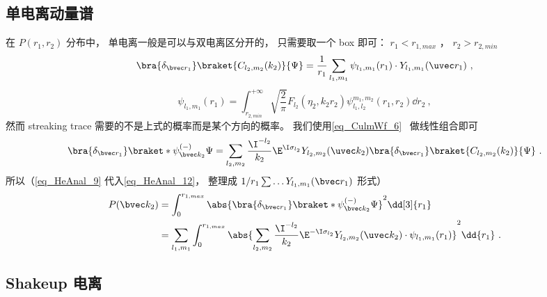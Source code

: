 \subsection{单电离动量谱}
在 $P(r_1, r_2)$ 分布中， 单电离一般是可以与双电离区分开的， 只需要取一个 box 即可： $r_1 < r_{1,max}$ ， $r_2 > r_{2,min}$
\begin{equation}\label{eq_HeAnal_9}
\bra{\delta_{\bvec r_1}}\braket{C_{l_2,m_2}(k_2)}{\Psi} = \frac{1}{r_1} \sum_{l_1, m_1} \psi_{l_1,m_1}(r_1) \cdot Y_{l_1, m_1}(\uvec r_1)~,
\end{equation}
\begin{equation}
\psi_{l_1,m_1}(r_1) = \int_{r_{2,min}}^{+\infty} \sqrt{\frac{2}{\pi}}F_{l_2}(\eta_2, k_2 r_2)\psi_{l_1, l_2}^{m_1, m_2}(r_1, r_2)\dd{r_2}~,
\end{equation}
然而 streaking trace 需要的不是上式的概率而是某个方向的概率。 我们使用\autoref{eq_CulmWf_6}~ 做线性组合即可
\begin{equation}\label{eq_HeAnal_12}
\bra{\delta_{\bvec r_1}}\braket*{\psi_{\bvec k_2}^{(-)}}{\Psi} = \sum_{l_2,m_2} \frac{\I^{-l_2}}{k_2} \E^{\I\sigma_{l_2}}Y_{l_2,m_2}(\uvec k_2) \bra{\delta_{\bvec r_1}}\braket{C_{l_2,m_2}(k_2)}{\Psi}~.
\end{equation}
所以（\autoref{eq_HeAnal_9} 代入\autoref{eq_HeAnal_12}， 整理成 $1/r_1\sum \dots Y_{l_1,m_1}(\bvec r_1)$ 形式）
\begin{equation}\label{eq_HeAnal_11}
\begin{aligned}
P(\bvec k_2) &= \int_0^{r_{1,max}} \abs{\bra{\delta_{\bvec r_1}}\braket*{\psi_{\bvec k_2}^{(-)}}{\Psi}}^2 \dd[3]{r_1}\\
&= \sum_{l_1,m_1} \int_0^{r_{1,max}} \abs{\sum_{l_2,m_2} \frac{\I^{-l_2}}{k_2} \E^{-\I \sigma_{l_2}} Y_{l_2,m_2}(\uvec k_2) \cdot \psi_{l_1,m_1}(r_1)}^2 \dd{r_1}~.
\end{aligned}
\end{equation}

\subsection{Shakeup 电离}

